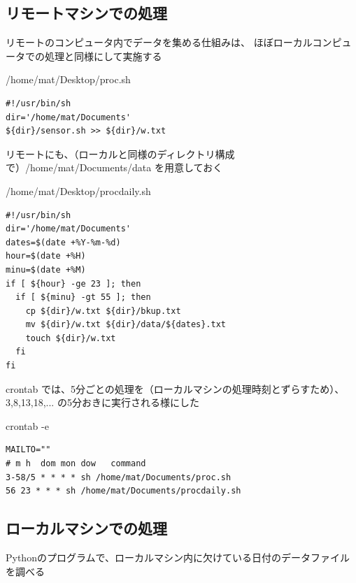 \documentclass[12pt,a4paper,uplatex]{jsarticle}
\begin{document}
\subsection{リモートマシンでの処理}

リモートのコンピュータ内でデータを集める仕組みは、
ほぼローカルコンピュータでの処理と同様にして実施する

\begin{itembox}[l]{/home/mat/Desktop/proc.sh}
	\begin{verbatim}
#!/usr/bin/sh
dir='/home/mat/Documents'
${dir}/sensor.sh >> ${dir}/w.txt
	\end{verbatim}
\end{itembox}

リモートにも、（ローカルと同様のディレクトリ構成で）/home/mat/Documents/data を用意しておく

\begin{itembox}[l]{/home/mat/Desktop/procdaily.sh}
	\begin{verbatim}
#!/usr/bin/sh
dir='/home/mat/Documents'
dates=$(date +%Y-%m-%d)
hour=$(date +%H)
minu=$(date +%M)
if [ ${hour} -ge 23 ]; then
  if [ ${minu} -gt 55 ]; then
    cp ${dir}/w.txt ${dir}/bkup.txt
    mv ${dir}/w.txt ${dir}/data/${dates}.txt
    touch ${dir}/w.txt
  fi
fi
	\end{verbatim}
\end{itembox}

\newpage

crontab では、5分ごとの処理を（ローカルマシンの処理時刻とずらすため）、3,8,13,18,... の5分おきに実行される様にした

\begin{itembox}[l]{crontab -e}
\begin{verbatim}
MAILTO=""
# m h  dom mon dow   command
3-58/5 * * * * sh /home/mat/Documents/proc.sh
56 23 * * * sh /home/mat/Documents/procdaily.sh
\end{verbatim}	
\end{itembox}

\newpage

\subsection{ローカルマシンでの処理}

Pythonのプログラムで、ローカルマシン内に欠けている日付のデータファイルを調べる
\end{document}
